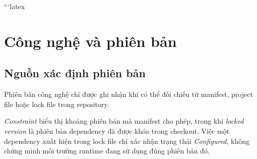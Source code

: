 ```latex
\chapter{Công nghệ và phiên bản}
\label{chap:technologies}

\section{Nguồn xác định phiên bản}

Phiên bản công nghệ chỉ được ghi nhận khi có thể đối chiếu từ manifest,
project file hoặc lock file trong repository.

\textit{Constraint} biểu thị khoảng phiên bản mà manifest cho phép, trong khi
\textit{locked version} là phiên bản dependency đã được khóa trong checkout.
Việc một dependency xuất hiện trong lock file chỉ xác nhận trạng thái
\textit{Configured}, không chứng minh môi trường runtime đang sử dụng đúng
phiên bản đó.

\begingroup
\small
\renewcommand{\arraystretch}{1.15}
\setlength{\tabcolsep}{4pt}

